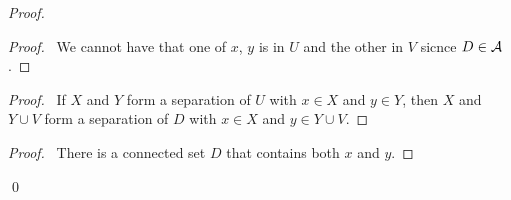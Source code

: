 \begin{proof}
    \begin{proof}
        \pf\ We cannot have that one of $x$, $y$ is in $U$ and the other in $V$ sicnce $D \in \AA$.
    \end{proof}
    \begin{proof}
        \pf\ If $X$ and $Y$ form a separation of $U$ with $x \in X$ and $y \in Y$, then $X$ and $Y \cup V$ form a separation of $D$ with $x \in X$
        and $y \in Y \cup V$.
    \end{proof}
    \qedstep
    \begin{proof}
        \pf\ There is a connected set $D$ that contains both $x$ and $y$.
    \end{proof}
    \qed
\end{proof}

